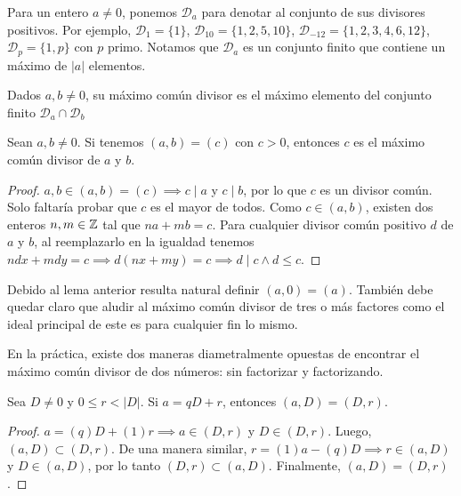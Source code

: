 \documentclass[main.tex]{subfiles}
\begin{document}
Para un entero $a \not= 0$, ponemos $\mathcal{D}_a$ para denotar al conjunto de sus divisores positivos. Por ejemplo, $\mathcal{D}_1 = \{1\}$, $\mathcal{D}_{10} = \{1, 2, 5, 10\}$, $\mathcal{D}_{-12} = \{1, 2, 3, 4, 6, 12\}$, $\mathcal{D}_p = \{1, p\}$ con $p$ primo. Notamos que $\mathcal{D}_a$ es un conjunto finito que contiene un m\'aximo de $|a|$ elementos.

\begin{defn}
    Dados $a, b \not= 0$, su m\'aximo com\'un divisor es el m\'aximo elemento del conjunto finito $\mathcal{D}_a \cap \mathcal{D}_b$
\end{defn}

\begin{lemma}
    Sean $a, b \not= 0$. Si tenemos $(a, b) = (c)$ con $c > 0$, entonces $c$ es el m\'aximo com\'un divisor de $a$ y $b$.
\end{lemma}

\begin{proof}
    $a, b \in (a, b) = (c) \implies c \mid a$ y $c \mid b$, por lo que $c$ es un divisor com\'un. Solo faltar\'ia probar que $c$ es el mayor de todos. Como $c \in (a, b)$, existen dos enteros $n, m \in \mathbb Z$ tal que $na + mb = c$. Para cualquier divisor com\'un positivo $d$ de $a$ y $b$, al reemplazarlo en la igualdad tenemos $ndx + mdy = c \implies d(nx + my) = c \implies d \mid c \land d \leq c$.
\end{proof}

Debido al lema anterior resulta natural definir $(a, 0) = (a)$. Tambi\'en debe quedar claro que aludir al m\'aximo com\'un divisor de tres o m\'as factores como el ideal principal de este es para cualquier fin lo mismo.

En la pr\'actica, existe dos maneras diametralmente opuestas de encontrar el m\'aximo com\'un divisor de dos n\'umeros: sin factorizar y factorizando.

\begin{theorem}
    Sea $D \not= 0$ y $0 \leq r < |D|$. Si $a = qD + r$, entonces $(a, D) = (D, r)$.
\end{theorem}

\begin{proof}
    $a = (q)D + (1)r \implies a \in (D, r)$ y $D \in (D, r)$. Luego, $(a, D) \subset (D, r)$. De una manera similar, $r = (1)a - (q)D \implies r \in (a, D)$ y $D \in (a, D)$, por lo tanto $(D, r) \subset (a, D)$. Finalmente, $(a, D) = (D, r)$.
\end{proof}
\end{document}
